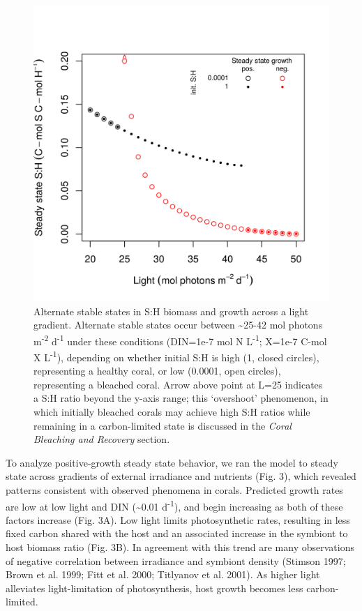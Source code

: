 \documentclass[]{elsarticle} %
\makeatletter
\def\maxwidth{\ifdim\Gin@nat@width>\linewidth\linewidth
\else\Gin@nat@width\fi}
\let\Oldincludegraphics\includegraphics
\renewcommand{\includegraphics}[1]{\Oldincludegraphics[width=\maxwidth]{#1}}
\makeatother
\begin{document}
\begin{figure}[htbp]
\centering
\includegraphics{../img/Fig2.png}
\caption{Alternate stable states in S:H biomass and growth across a
light gradient. Alternate stable states occur between
\textasciitilde{}25-42 mol photons m\textsuperscript{-2}
d\textsuperscript{-1} under these conditions (DIN=1e-7 mol N
L\textsuperscript{-1}; X=1e-7 C-mol X L\textsuperscript{-1}), depending
on whether initial S:H is high (1, closed circles), representing a
healthy coral, or low (0.0001, open circles), representing a bleached
coral. Arrow above point at L=25 indicates a S:H ratio beyond the y-axis
range; this `overshoot' phenomenon, in which initially bleached corals
may achieve high S:H ratios while remaining in a carbon-limited state is
discussed in the \emph{Coral Bleaching and Recovery} section.}
\end{figure}

To analyze positive-growth steady state behavior, we ran the model to
steady state across gradients of external irradiance and nutrients (Fig.
3), which revealed patterns consistent with observed phenomena in
corals. Predicted growth rates are low at low light and DIN
(\textasciitilde{}0.01 d\textsuperscript{-1}), and begin increasing as
both of these factors increase (Fig. 3A). Low light limits
photosynthetic rates, resulting in less fixed carbon shared with the
host and an associated increase in the symbiont to host biomass ratio
(Fig. 3B). In agreement with this trend are many observations of
negative correlation between irradiance and symbiont density (Stimson
1997; Brown et al. 1999; Fitt et al. 2000; Titlyanov et al. 2001). As
higher light alleviates light-limitation of photosynthesis, host growth
becomes less carbon-limited.
\end{document}
